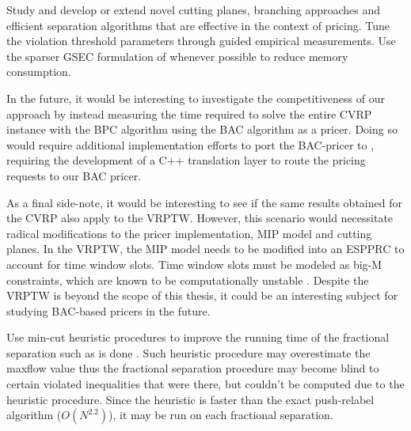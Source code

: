 Study and develop or extend novel cutting planes, branching approaches and efficient separation algorithms that are effective in the context of pricing.
Tune the violation threshold parameters through guided empirical measurements.
Use the sparser GSEC formulation of  whenever possible to reduce memory consumption.

\medskip

In the future, it would be interesting to investigate the competitiveness of our approach by instead measuring the time required to solve the entire CVRP instance with the BPC algorithm using the BAC algorithm as a pricer.
Doing so would require additional implementation efforts to port the BAC-pricer to \bapcod{}, requiring the development of a C++ translation layer to route the \bapcod{} pricing requests to our BAC pricer.

As a final side-note, it would be interesting to see if the same results obtained for the CVRP also apply to the VRPTW.
However, this scenario would necessitate radical modifications to the pricer implementation, MIP model and cutting planes.
In the VRPTW, the MIP model needs to be modified into an ESPPRC to account for time window slots.
Time window slots must be modeled as big-M constraints, which are known to be computationally unstable \parencite{jepsen2008branchandcut}.
Despite the VRPTW is beyond the scope of this thesis, it could be an interesting subject for studying BAC-based pricers in the future.




Use min-cut heuristic procedures to improve the running time of the fractional separation such as is done \textcite{kernighan1970}.
Such heuristic procedure may overestimate the maxflow value thus the fractional separation procedure may become blind to certain violated inequalities that were there, but couldn't be computed due to the heuristic procedure.
Since the heuristic is faster than the exact push-relabel algorithm ($O(N^{2.2})$), it may be run on each fractional separation.

